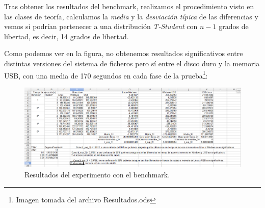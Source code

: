 \documentclass[paper=a4, fontsize=11pt]{scrartcl} %
\numberwithin{equation}{section} %
\numberwithin{figure}{section} %
\numberwithin{table}{section} %
\begin{document}
		Tras obtener los resultados del benchmark, realizamos el procedimiento visto en las clases
		de teoría, calculamos la \textit{media} y la \textit{desviación típica} de las diferencias y
		vemos si podrían pertenecer a una distribución \textit{T-Student} con $n-1$ grados de
		libertad, es decir, 14 grados de libertad.
		
		Como podemos ver en la figura, no obtenemos resultados significativos entre distintas
		versiones del sistema de ficheros pero sí entre el disco duro y la memoria USB, con una
		media de 170 segundos en cada fase de la prueba\footnote{Imagen tomada del archivo
		Resultados.ods}:
		 
		 \begin{figure}[H]
 			\centering
			\includegraphics[width=15cm]{Resultados.jpg}
 			\caption{Resultados del experimento con el benchmark.}
 			\label{fig:benchmark}	
 		\end{figure}

		\cite{man_benchmark}

\newpage
\end{document}
